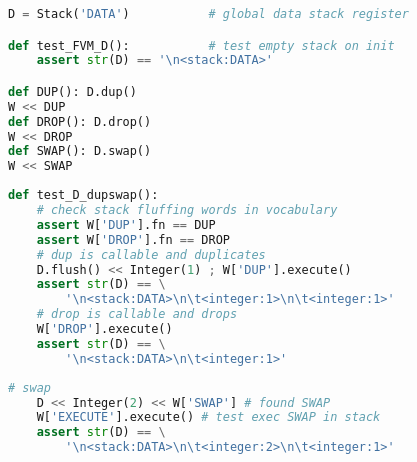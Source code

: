 \clearpage{}\label{Dstack}

\begin{lstlisting}[language=Python]
D = Stack('DATA')			# global data stack register

def test_FVM_D():			# test empty stack on init
	assert str(D) == '\n<stack:DATA>'

def DUP(): D.dup()
W << DUP
def DROP(): D.drop()
W << DROP
def SWAP(): D.swap()
W << SWAP
\end{lstlisting}
\begin{lstlisting}[language=Python]
def test_D_dupswap():
	# check stack fluffing words in vocabulary
	assert W['DUP'].fn == DUP
	assert W['DROP'].fn == DROP
	# dup is callable and duplicates
	D.flush() << Integer(1) ; W['DUP'].execute()
	assert str(D) == \
		'\n<stack:DATA>\n\t<integer:1>\n\t<integer:1>'
	# drop is callable and drops
	W['DROP'].execute()
	assert str(D) == \
		'\n<stack:DATA>\n\t<integer:1>'
\end{lstlisting}
\begin{lstlisting}[language=Python]
	# swap
	D << Integer(2) << W['SWAP'] # found SWAP
	W['EXECUTE'].execute() # test exec SWAP in stack
	assert str(D) == \
		'\n<stack:DATA>\n\t<integer:2>\n\t<integer:1>'
\end{lstlisting}
